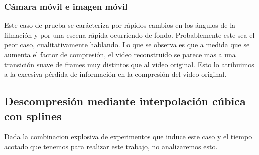 \subsubsection{Cámara móvil e imagen móvil}
Este caso de prueba se carácteriza por rápidos cambios en los ángulos de la filmación y por una escena rápida ocurriendo de fondo. Probablemente este sea el peor caso, cualitativamente hablando. Lo que se observa es que a medida que se aumenta el factor de compresión, el video reconstruido se parece mas a una transición suave de frames muy distintos que al video original. Esto lo atribuimos a la excesiva pérdida de información en la compresión del video original. 

\subsection{Descompresión mediante interpolación cúbica con splines}
Dada la combinacion explosiva de experimentos que induce este caso y el tiempo acotado que tenemos para realizar este trabajo, no analizaremos esto.

